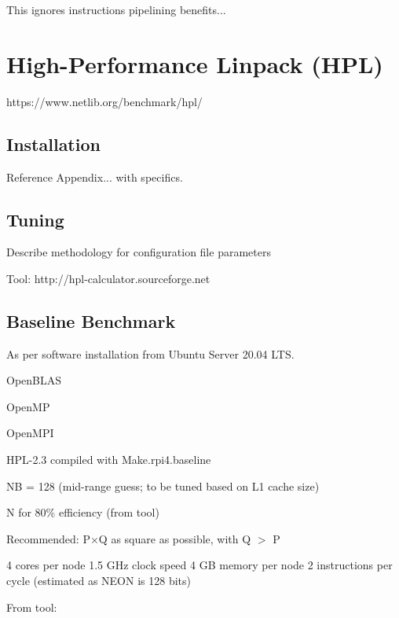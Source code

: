 \documentclass{article}
\begin{document}
This ignores instructions pipelining benefits...


%
%
\section{High-Performance Linpack (HPL)}

https://www.netlib.org/benchmark/hpl/

\subsection{Installation}

Reference Appendix... with specifics.

\subsection{Tuning}

Describe methodology for configuration file parameters

Tool: http://hpl-calculator.sourceforge.net

\subsection{Baseline Benchmark}
As per software installation from Ubuntu Server 20.04 LTS.

OpenBLAS

OpenMP

OpenMPI

HPL-2.3 compiled with Make.rpi4.baseline

NB = 128 (mid-range guess; to be tuned based on L1 cache size)

N for 80\% efficiency (from tool)

Recommended: P$\times$Q as square as possible, with Q $>$ P

4 cores per node
1.5 GHz clock speed
4 GB memory per node
2 instructions per cycle (estimated as NEON is 128 bits)

From tool:

\end{document}
